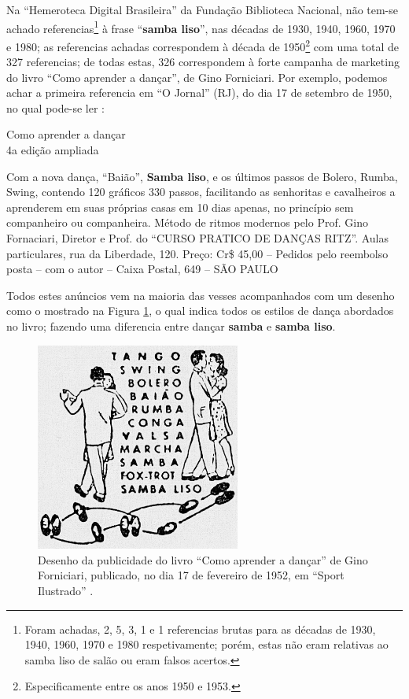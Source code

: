 Na ``Hemeroteca Digital Brasileira'' da Fundação Biblioteca Nacional,
não tem-se achado referencias\footnote{ Foram achadas,
2, 5, 3, 1 e 1 referencias brutas para as décadas de 1930, 1940, 1960, 1970 e 1980 respetivamente;
porém, estas não eram relativas ao samba liso de salão ou eram falsos acertos.} 
à frase ``\textbf{samba liso}'', nas décadas de 1930, 1940, 1960, 1970 e 1980;
as referencias achadas correspondem à década de 1950\footnote{Especificamente entre os anos 1950 e 1953.}  
com uma total de 327 referencias;
de todas estas, 326 correspondem à forte campanha 
de marketing do livro
``Como aprender a dançar'', 
de Gino Forniciari. 
Por exemplo, podemos achar a primeira referencia em ``O Jornal'' (RJ),
do dia 17 de setembro de 1950, no qual pode-se ler \cite[3ra seção pp. 9]{jornalanunciodanca1}:
\begin{citando}
\begin{center}
Como aprender a dançar\\
4a edição ampliada
\end{center}
Com a nova dança, ``Baião'', \textbf{Samba liso}, e os
últimos passos de Bolero, Rumba, Swing, contendo
120 gráficos 330 passos, facilitando as senhoritas 
e cavalheiros a aprenderem em suas próprias 
casas em 10 dias apenas, no princípio sem
companheiro ou companheira. Método de ritmos modernos
pelo Prof. Gino Fornaciari, 
Diretor e Prof. do ``CURSO PRATICO DE DANÇAS RITZ''.
Aulas particulares, rua da Liberdade, 120.
Preço: Cr\$ 45,00 -- Pedidos pelo reembolso posta 
-- com o autor -- Caixa Postal, 649 -- SÃO PAULO 
\end{citando}
Todos estes anúncios vem na maioria das vesses acompanhados com um desenho como
o mostrado na Figura \ref{fig:desenholivrodanca1}, o qual indica todos os estilos de dança abordados no livro;
fazendo uma diferencia entre dançar \textbf{samba} e \textbf{samba liso}.
\begin{figure}[h]
  \centering
    \includegraphics[width=0.6\textwidth]{chapters/cap-historia-dancasamba/comoaprenderdancar.jpg}
  \caption{Desenho da publicidade do livro ``Como aprender a dançar'' de Gino Forniciari,
publicado, no dia 17 de fevereiro de 1952, em ``Sport Ilustrado'' \cite[pp. 22]{sportlivropublidanca}.}
\label{fig:desenholivrodanca1}
\end{figure}

